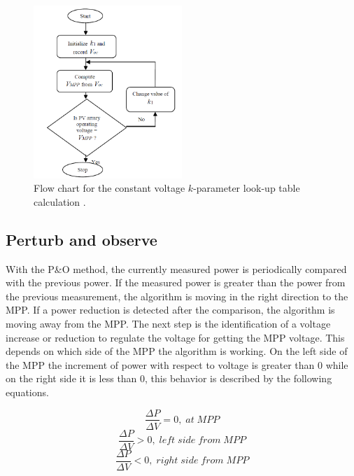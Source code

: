 \begin{figure}[H]
	\begin{center}
		\includegraphics[width=0.5\textwidth]{../Pictures/P1/Flow_chart/Flow_chart_constant_voltage}
		\caption{Flow chart for the constant voltage $k$-parameter look-up table calculation \cite{flowchartVC}. }
		\label{fcconstantvoltage}
	\end{center}	
\end{figure}
 

\subsection{Perturb and observe}
With the P\&O method, the currently measured power is periodically compared with the previous power. If the measured power is greater than the power from the previous measurement, the algorithm is moving in the right direction to the MPP. If a power reduction is detected after the comparison, the algorithm is moving away from the MPP. The next step is the identification of a voltage increase or reduction to regulate the voltage for getting the MPP voltage.
This depends on which side of the MPP the algorithm is working.
On the left side of the MPP the increment of power with respect to voltage is greater than 0 while on the right side it is less than 0, this behavior is described by the following equations. \cite{AN1521_MC}

\begin{equation} \label{PO1}
\frac{\Delta P}{\Delta V} = 0 ,\; at\; MPP 
\end{equation} 
\begin{equation} \label{PO2}
\frac{\Delta P}{\Delta V} > 0 ,\; left\; side\; from\; MPP 
\end{equation}
\begin{equation} \label{PO3}
\frac{\Delta P}{\Delta V} < 0 ,\; right\; side\; from\; MPP
\end{equation}


